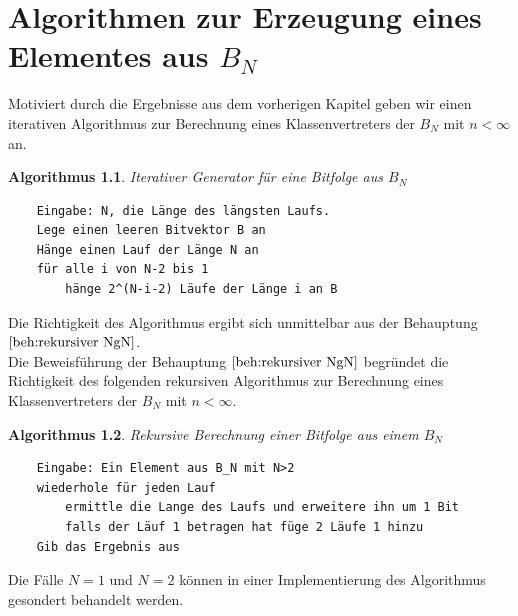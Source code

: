 \documentclass[11pt,oneside,a4paper]{scrreprt}
\newtheorem{algorithmus}{Algorithmus}
\begin{document}
\chapter{Algorithmen zur Erzeugung eines Elementes aus $B_N$}
\noindent Motiviert durch die Ergebnisse aus dem vorherigen Kapitel geben wir einen iterativen Algorithmus zur Berechnung eines Klassenvertreters der $B_N$ mit $n<\infty$ an.

\begin{algorithmus}\label{alg:ItereativerGeneratorFürB_N}
	Iterativer Generator für eine Bitfolge aus $B_N$
	\lstset{caption=Itereative Erzeugung einer Folge aus $B_N$ für einen beliebigen $N<\infty$}
	\begin{lstlisting}
	Eingabe: N, die Länge des längsten Laufs.
	Lege einen leeren Bitvektor B an
	Hänge einen Lauf der Länge N an 
	für alle i von N-2 bis 1
		hänge 2^(N-i-2) Läufe der Länge i an B	\end{lstlisting}
\end{algorithmus}

\noindent Die Richtigkeit des Algorithmus ergibt sich unmittelbar aus der Behauptung $\ref{beh:rekursiver NgN}$.\\

\noindent Die Beweisführung der Behauptung $\ref{beh:rekursiver NgN}$ begründet die Richtigkeit des folgenden rekursiven Algorithmus zur Berechnung eines Klassenvertreters der $B_N$ mit $n<\infty$.

\begin{algorithmus}\label{Listing:RekursiveBerechungEinerZufälligenBitfolge}
	Rekursive Berechnung einer Bitfolge aus einem $B_N$
	\lstset{caption=rekursive Berechung einer Bitfolge aus $B_N$}
	\begin{lstlisting}
	Eingabe: Ein Element aus B_N mit N>2
	wiederhole für jeden Lauf
		ermittle die Lange des Laufs und erweitere ihn um 1 Bit
		falls der Läuf 1 betragen hat füge 2 Läufe 1 hinzu
	Gib das Ergebnis aus\end{lstlisting}

\end{algorithmus}
Die Fälle $N=1$ und $N=2$ können in einer Implementierung des Algorithmus gesondert behandelt werden.\\
\end{document}
